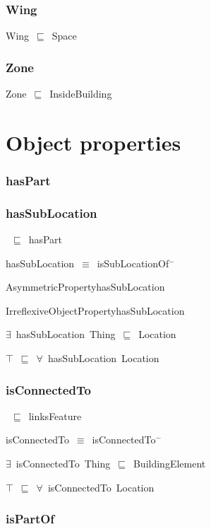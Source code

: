 \documentclass{article}
\begin{document}
\subsubsection*{Wing}

Wing~\ensuremath{\sqsubseteq}~Space~

\subsubsection*{Zone}

Zone~\ensuremath{\sqsubseteq}~InsideBuilding~

\section*{Object properties}\subsubsection*{hasPart}

\subsubsection*{hasSubLocation}

~\ensuremath{\sqsubseteq}~hasPart

hasSubLocation~\ensuremath{\equiv}~isSubLocationOf\ensuremath{^-}

AsymmetricPropertyhasSubLocation

IrreflexiveObjectPropertyhasSubLocation

\ensuremath{\exists}~hasSubLocation~Thing~\ensuremath{\sqsubseteq}~Location

\ensuremath{\top}~\ensuremath{\sqsubseteq}~\ensuremath{\forall}~hasSubLocation~Location

\subsubsection*{isConnectedTo}

~\ensuremath{\sqsubseteq}~linksFeature

isConnectedTo~\ensuremath{\equiv}~isConnectedTo\ensuremath{^-}

\ensuremath{\exists}~isConnectedTo~Thing~\ensuremath{\sqsubseteq}~BuildingElement

\ensuremath{\top}~\ensuremath{\sqsubseteq}~\ensuremath{\forall}~isConnectedTo~Location

\subsubsection*{isPartOf}
\end{document}
